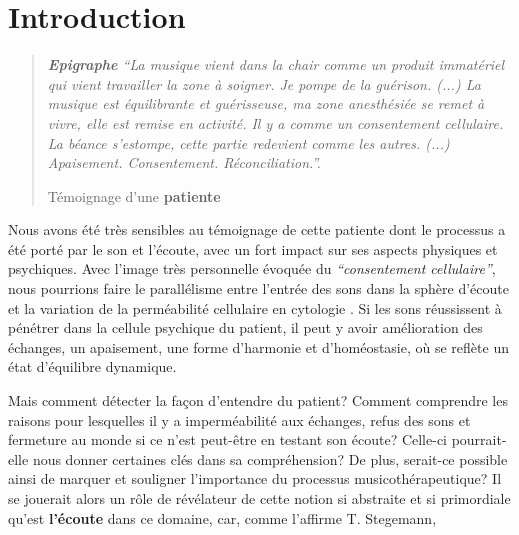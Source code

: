 

\chapter{Introduction}



\begin{quotation}
 \textit{\textbf{Epigraphe  }   ``La musique vient dans la chair comme un produit immatériel
 qui vient travailler la zone à soigner. Je pompe de la
 guérison.
 (...) 
 La musique est équilibrante et guérisseuse, ma zone
 anesthésiée se remet à vivre, elle est remise en activité.
 Il y a comme un consentement cellulaire.
La béance s'estompe, cette
partie redevient comme les autres. (...)
Apaisement. Consentement. Réconciliation.''.}

Témoignage d'une\textbf{
patiente}

\end{quotation}

Nous avons été très sensibles au témoignage de cette patiente dont le
processus a été porté par le son et l'écoute, avec un fort impact
sur ses aspects physiques
et psychiques.
Avec l'image très personnelle évoquée du
\textit{``consentement cellulaire''}, nous pourrions faire le
parallélisme entre l'entrée des sons dans la sphère d'écoute et la variation de la 
perméabilité cellulaire en cytologie \autocite[ch. 3 pp. 70--76]{marieb:biologie}. Si les sons réussissent à pénétrer dans la
cellule psychique du patient, il peut y avoir amélioration des
échanges, un apaisement, une forme d'harmonie et d'homéostasie,  \autocite[ch. 1
p. 10]{marieb:biologie} où se reflète un état d'équilibre dynamique.

Mais comment détecter la façon d'entendre du patient?
Comment comprendre les raisons pour lesquelles il y a imperméabilité
aux
échanges, refus des sons et fermeture au monde si ce n'est
peut-être  en testant
son écoute?  Celle-ci pourrait-elle nous donner certaines clés dans sa
compréhension? 
De plus, serait-ce possible ainsi
de marquer et souligner l'importance du processus musicothérapeutique? 
Il se jouerait alors un
rôle de
révélateur de cette notion si abstraite et si primordiale qu'est
\textbf{l'écoute} dans ce domaine, car, comme l'affirme T. Stegemann,


